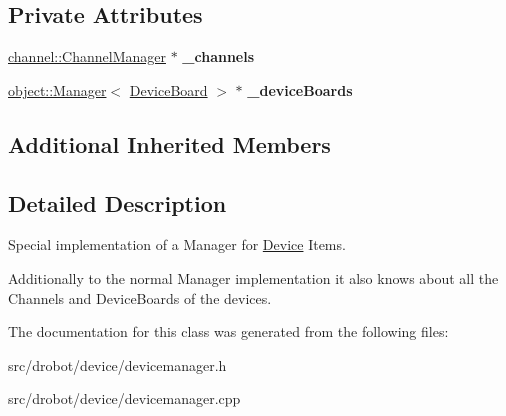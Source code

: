 \subsection*{Private Attributes}
\begin{DoxyCompactItemize}
\item 
\hypertarget{classdrobot_1_1device_1_1DeviceManager_ae348bc4e97657d6a2222a61553e4327c}{\hyperlink{classdrobot_1_1device_1_1channel_1_1ChannelManager}{channel\-::\-Channel\-Manager} $\ast$ {\bfseries \-\_\-channels}}\label{classdrobot_1_1device_1_1DeviceManager_ae348bc4e97657d6a2222a61553e4327c}

\item 
\hypertarget{classdrobot_1_1device_1_1DeviceManager_abc4c2b56c5ae9aa5e0a906bc288b87b6}{\hyperlink{classdrobot_1_1object_1_1Manager}{object\-::\-Manager}$<$ \hyperlink{classdrobot_1_1device_1_1DeviceBoard}{Device\-Board} $>$ $\ast$ {\bfseries \-\_\-device\-Boards}}\label{classdrobot_1_1device_1_1DeviceManager_abc4c2b56c5ae9aa5e0a906bc288b87b6}

\end{DoxyCompactItemize}
\subsection*{Additional Inherited Members}


\subsection{Detailed Description}
Special implementation of a Manager for \hyperlink{classdrobot_1_1device_1_1Device}{Device} Items. 

Additionally to the normal Manager implementation it also knows about all the Channels and Device\-Boards of the devices. 

The documentation for this class was generated from the following files\-:\begin{DoxyCompactItemize}
\item 
src/drobot/device/devicemanager.\-h\item 
src/drobot/device/devicemanager.\-cpp\end{DoxyCompactItemize}
